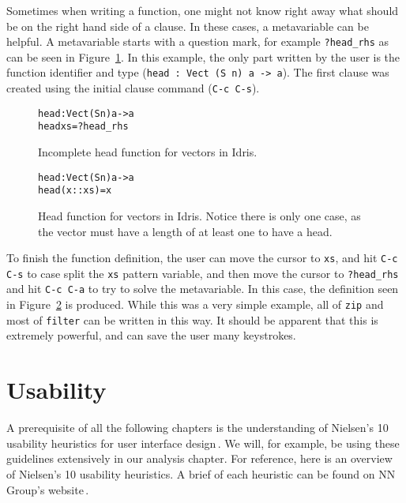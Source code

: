 Sometimes when writing a function, one might not know right away what should be on the right hand side of a clause.
In these cases, a metavariable can be helpful. A metavariable starts with a question mark, for example \texttt{?head\_rhs} as can be seen in Figure~\ref{fig:incomplete_head}.
In this example, the only part written by the user is the function identifier and type (\texttt{head : Vect (S n) a -> a}).
The first clause was created using the initial clause command (\texttt{C-c C-s}).

\begin{figure}[ht]
\begin{alltt}
head : Vect (S n) a -> a
head xs = ?head_rhs
\end{alltt}
\caption{Incomplete head function for vectors in Idris.}
\label{fig:incomplete_head}
\end{figure}

\begin{figure}[ht]
\begin{alltt}
head : Vect (S n) a -> a
head (x :: xs) = x
\end{alltt}
\caption{Head function for vectors in Idris. Notice there is only one case, as the vector must have a length of at least one to have a head.}
\label{fig:head}
\end{figure}

To finish the function definition, the user can move the cursor to \texttt{xs}, and hit \texttt{C-c C-s} to case split the \texttt{xs} pattern variable, and then move the cursor to \texttt{?head\_rhs} and hit \texttt{C-c C-a} to try to solve the metavariable.
In this case, the definition seen in Figure~\ref{fig:head} is produced.
While this was a very simple example, all of \texttt{zip} and most of \texttt{filter} can be written in this way.
It should be apparent that this is extremely powerful, and can save the user many keystrokes.

\section{Usability}
A prerequisite of all the following chapters is the understanding of Nielsen's
10 usability heuristics for user interface design\,\cite{nielsen1990heuristic}.
We will, for example, be using these guidelines extensively in our analysis chapter.
For reference, here is an overview of Nielsen's 10 usability heuristics.
A brief of each heuristic can be found on NN Group's
website\,\cite{niesen10heuristicsweb}.

